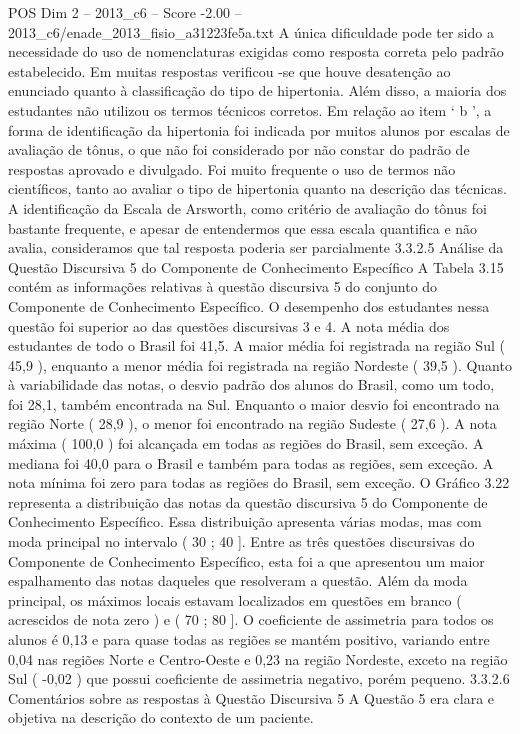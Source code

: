 \begin{textsample}{POS Dim 2 – 2013\_c6 – Score -2.00 – 2013\_c6/enade\_2013\_fisio\_a31223fe5a.txt}
A única dificuldade pode ter sido a necessidade do uso de nomenclaturas exigidas como resposta correta pelo padrão estabelecido.
Em muitas respostas verificou -se que houve desatenção ao enunciado quanto à classificação do tipo de hipertonia.
Além disso, a maioria dos estudantes não utilizou os termos técnicos corretos.
Em relação ao item ‘ b ’, a forma de identificação da hipertonia foi indicada por muitos alunos por escalas de avaliação de tônus, o que não foi considerado por não constar do padrão de respostas aprovado e divulgado.
Foi muito frequente o uso de termos não científicos, tanto ao avaliar o tipo de hipertonia quanto na descrição das técnicas.
A identificação da Escala de Arsworth, como critério de avaliação do tônus foi bastante frequente, e apesar de entendermos que essa escala quantifica e não avalia, consideramos que tal resposta poderia ser parcialmente 3.3.2.5 Análise da Questão Discursiva 5 do Componente de Conhecimento Específico A Tabela 3.15 contém as informações relativas à questão discursiva 5 do conjunto do Componente de Conhecimento Específico.
O desempenho dos estudantes nessa questão foi superior ao das questões discursivas 3 e 4.
A nota média dos estudantes de todo o Brasil foi 41,5.
A maior média foi registrada na região Sul ( 45,9 ), enquanto a menor média foi registrada na região Nordeste ( 39,5 ).
Quanto à variabilidade das notas, o desvio padrão dos alunos do Brasil, como um todo, foi 28,1, também encontrada na Sul.
Enquanto o maior desvio foi encontrado na região Norte ( 28,9 ), o menor foi encontrado na região Sudeste ( 27,6 ).
A nota máxima ( 100,0 ) foi alcançada em todas as regiões do Brasil, sem exceção.
A mediana foi 40,0 para o Brasil e também para todas as regiões, sem exceção.
A nota mínima foi zero para todas as regiões do Brasil, sem exceção.
O Gráfico 3.22 representa a distribuição das notas da questão discursiva 5 do Componente de Conhecimento Específico.
Essa distribuição apresenta várias modas, mas com moda principal no intervalo ( 30 ; 40 ].
Entre as três questões discursivas do Componente de Conhecimento Específico, esta foi a que apresentou um maior espalhamento das notas daqueles que resolveram a questão.
Além da moda principal, os máximos locais estavam localizados em questões em branco ( acrescidos de nota zero ) e ( 70 ; 80 ].
O coeficiente de assimetria para todos os alunos é 0,13 e para quase todas as regiões se mantém positivo, variando entre 0,04 nas regiões Norte e Centro-Oeste e 0,23 na região Nordeste, exceto na região Sul ( -0,02 ) que possui coeficiente de assimetria negativo, porém pequeno. 3.3.2.6 Comentários sobre as respostas à Questão Discursiva 5 A Questão 5 era clara e objetiva na descrição do contexto de um paciente.

\end{textsample}
